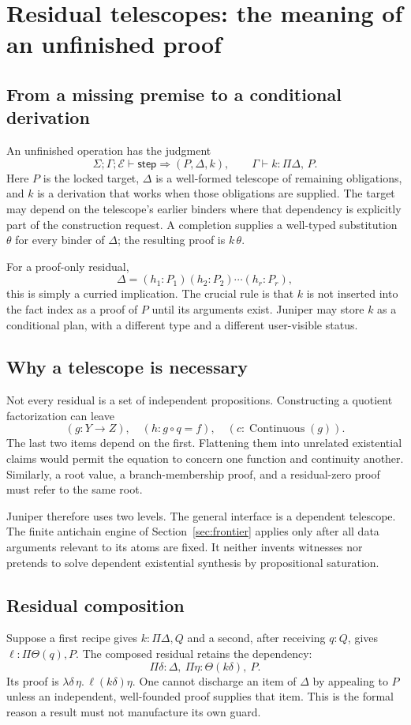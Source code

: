 \documentclass[11pt,a4paper]{article}
\theoremstyle{definition}\newtheorem{definition}[theorem]{Definition}
\theoremstyle{remark}\newtheorem{remark}[theorem]{Remark}
\begin{document}
\section{Residual telescopes: the meaning of an unfinished proof}
\label{sec:residual}
\subsection{From a missing premise to a conditional derivation}
An unfinished operation has the judgment
\[
 \Sigma;\Gamma;\mathcal E\vdash \mathsf{step}\Rightarrow(P,\Delta,k),
 \qquad \Gamma\vdash k:\Pi\Delta,\,P.
\]
Here $P$ is the locked target, $\Delta$ is a well-formed telescope of remaining obligations, and $k$ is a derivation that works when those obligations are supplied. The target may depend on the telescope's earlier binders where that dependency is explicitly part of the construction request. A completion supplies a well-typed substitution $\theta$ for every binder of $\Delta$; the resulting proof is $k\,\theta$.

For a proof-only residual,
\[
 \Delta=(h_1:P_1)(h_2:P_2)\cdots(h_r:P_r),
\]
this is simply a curried implication. The crucial rule is that $k$ is not inserted into the fact index as a proof of $P$ until its arguments exist. Juniper may store $k$ as a conditional plan, with a different type and a different user-visible status.

\subsection{Why a telescope is necessary}
Not every residual is a set of independent propositions. Constructing a quotient factorization can leave
\[
 (g:Y\to Z),\quad (h:g\circ q=f),\quad (c:\operatorname{Continuous}(g)).
\]
The last two items depend on the first. Flattening them into unrelated existential claims would permit the equation to concern one function and continuity another. Similarly, a root value, a branch-membership proof, and a residual-zero proof must refer to the same root.

Juniper therefore uses two levels. The general interface is a dependent telescope. The finite antichain engine of Section~\ref{sec:frontier} applies only after all data arguments relevant to its atoms are fixed. It neither invents witnesses nor pretends to solve dependent existential synthesis by propositional saturation.

\subsection{Residual composition}
Suppose a first recipe gives $k:\Pi\Delta, Q$ and a second, after receiving $q:Q$, gives $\ell:\Pi\Theta(q),P$. The composed residual retains the dependency:
\[
 \Pi\delta:\Delta,\ \Pi\eta:\Theta(k\delta),\ P.
\]
Its proof is $\lambda\delta\,\eta.\,\ell(k\delta)\eta$. One cannot discharge an item of $\Delta$ by appealing to $P$ unless an independent, well-founded proof supplies that item. This is the formal reason a result must not manufacture its own guard.
\end{document}
